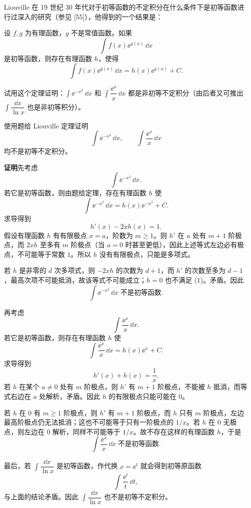 \begin{xreferenceproblem}[7]
Liouville 在 19 世纪 30 年代对于初等函数的不定积分在什么条件下是初等函数进行过深入的研究（参见 [55]），他得到的一个结果是：

  \begin{xtheorem}
  设 $f,g$ 为有理函数，$g$ 不是常值函数。如果
  \[
    \int f(x)\ee^{g(x)}\,\dd x
  \]
  是初等函数，则存在有理函数 $h$，使得
  \[
    \int f(x)\ee^{g(x)}\,\dd x=h(x)\ee^{g(x)}+C.
  \]
  \end{xtheorem}

  试用这个定理证明：$\int\ee^{-x^2}\,\dd x$ 和 $\int\dfrac{\ee^x}{x}\,\dd x$ 都是非初等不定积分（由后者又可推出 $\int\dfrac{\dd x}{\ln x}$ 也是非初等积分）。
\end{xreferenceproblem}
\begin{xsolution}
使用题给 Liouville 定理证明
  \[
    \int\ee^{-x^2}\,\dd x,
    \qquad
    \int\frac{\ee^x}{x}\,\dd x
  \]
  均不是初等不定积分。

  \textbf{证明}\quad 先考虑
  \[
    \int\ee^{-x^2}\,\dd x.
  \]
  若它是初等函数，则由题给定理，存在有理函数 $h$ 使
  \[
    \int\ee^{-x^2}\,\dd x=h(x)\ee^{-x^2}+C.
  \]
  求导得到
  \[
    h'(x)-2xh(x)=1.
  \]
  假设有理函数 $h$ 有有限极点 $x=a$，阶数为 $m\ge1$。则 $h'$ 在 $a$ 处有 $m+1$ 阶极点，而 $2xh$ 至多有 $m$ 阶极点（当 $a=0$ 时甚至更低），因此上述等式左边必有极点，不可能等于常数 $1$。所以 $h$ 没有有限极点，只能是多项式。

  若 $h$ 是非零的 $d$ 次多项式，则 $-2xh$ 的次数为 $d+1$，而 $h'$ 的次数至多为 $d-1$，最高次项不可能抵消，故该等式不可能成立；$h=0$ 也不满足 (1)。矛盾。因此
  \[
    \boxed{\int\ee^{-x^2}\,\dd x\text{ 不是初等函数}}.
  \]

  再考虑
  \[
    \int\frac{\ee^x}{x}\,\dd x.
  \]
  若它是初等函数，则存在有理函数 $h$ 使
  \[
    \int\frac{\ee^x}{x}\,\dd x=h(x)\ee^x+C.
  \]
  求导得到
  \[
    h'(x)+h(x)=\frac1x.
  \]
  若 $h$ 在某个 $a\ne0$ 处有 $m$ 阶极点，则 $h'$ 有 $m+1$ 阶极点，不能被 $h$ 抵消，而等式右边在 $a$ 处解析，矛盾。因此 $h$ 的有限极点只能可能在 $0$。

  若 $h$ 在 $0$ 有 $m\ge1$ 阶极点，则 $h'$ 有 $m+1$ 阶极点，而 $h$ 只有 $m$ 阶极点，左边最高阶极点仍无法抵消；这也不可能等于只有一阶极点的 $1/x$。若 $h$ 在 $0$ 无极点，则左边在 $0$ 解析，同样不可能等于 $1/x$。故不存在这样的有理函数 $h$，于是
  \[
    \boxed{\int\frac{\ee^x}{x}\,\dd x\text{ 不是初等函数}}.
  \]

  最后，若 $\int\dfrac{\dd x}{\ln x}$ 是初等函数，作代换 $x=\ee^t$ 就会得到初等原函数
  \[
    \int\frac{\ee^t}{t}\,\dd t,
  \]
  与上面的结论矛盾。因此 $\int\dfrac{\dd x}{\ln x}$ 也不是初等不定积分。
\end{xsolution}

